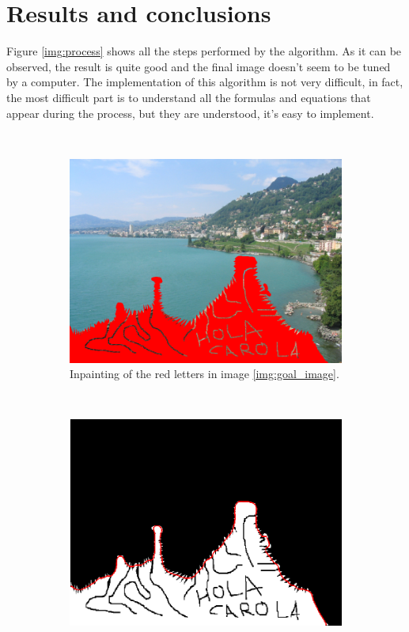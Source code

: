 \documentclass[10pt,a4paper]{llncs}
\begin{document}
\section{ Results and conclusions}
Figure \ref{img:process} shows all the steps performed by the algorithm. As it can be observed, the result is quite good and the final image doesn't seem to be tuned by a computer.
The implementation of this algorithm is not very difficult, in fact, the most difficult part is to understand all the formulas and equations that appear during the process, but they are understood, it's easy to implement.
\begin{figure}[b]
    \centering
%
    ~ 
        \begin{subfigure}[b]{0.3\textwidth}
        \includegraphics[width=\textwidth]{Goal_inpaint}
	\caption{Inpainting of the red letters in image \ref{img:goal_image}. }
	\label{img:process_01}
    \end{subfigure}
	~
	\begin{subfigure}[b]{0.3\textwidth}
        \includegraphics[width=\textwidth]{Goal_segmentation}

\end{subfigure}
\end{figure}
\end{document}

